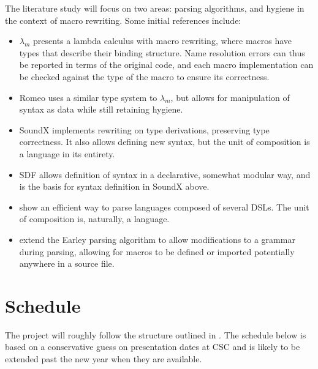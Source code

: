 \documentclass[10pt,a4paper]{article}
\begin{document}
The literature study will focus on two areas: parsing algorithms, and hygiene in the context of macro rewriting. Some initial references include:
\begin{itemize}
\item $\lambda_m$ \cite{Herman2010} presents a lambda calculus with macro rewriting, where macros have types that describe their binding structure. Name resolution errors can thus be reported in terms of the original code, and each macro implementation can be checked against the type of the macro to ensure its correctness.

\item Romeo \cite{Stansifer2014} uses a similar type system to $\lambda_m$, but allows for manipulation of syntax as data while still retaining hygiene.

\item SoundX \cite{Lorenzen2016} implements rewriting on type derivations, preserving type correctness. It also allows defining new syntax, but the unit of composition is a language in its entirety.

\item SDF \cite{Heering1989} allows definition of syntax in a declarative, somewhat modular way, and is the basis for syntax definition in SoundX above.

\item \textcite{Silkensen2013} show an efficient way to parse languages composed of several DSLs. The unit of composition is, naturally, a language.

\item \textcite{Stansifer2011} extend the Earley parsing algorithm to allow modifications to a grammar during parsing, allowing for macros to be defined or imported potentially anywhere in a source file.
\end{itemize}

\section{Schedule}

The project will roughly follow the structure outlined in \cite{Broman2015}. The schedule below is based on a conservative guess on presentation dates at CSC and is likely to be extended past the new year when they are available.
\end{document}
